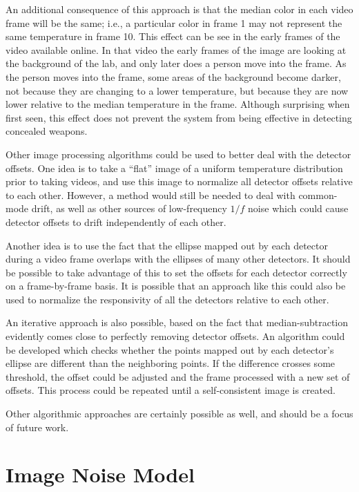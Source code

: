 An additional consequence of this approach is that the median color in each video frame will be the same; i.e., a particular color in frame 1 may not represent the same temperature in frame 10.
This effect can be see in the early frames of the video available online.
In that video the early frames of the image are looking at the background of the lab, and only later does a person move into the frame.
As the person moves into the frame, some areas of the background become darker, not because they are changing to a lower temperature, but because they are now lower relative to the median temperature in the frame.
Although surprising when first seen, this effect does not prevent the system from being effective in detecting concealed weapons.

Other image processing algorithms could be used to better deal with the detector offsets.
One idea is to take a ``flat'' image of a uniform temperature distribution prior to taking videos, and use this image to normalize all detector offsets relative to each other.
However, a method would still be needed to deal with common-mode drift, as well as other sources of low-frequency $1/f$ noise which could cause detector offsets to drift independently of each other.

Another idea is to use the fact that the ellipse mapped out by each detector during a video frame overlaps with the ellipses of many other detectors.
It should be possible to take advantage of this to set the offsets for each detector correctly on a frame-by-frame basis.
It is possible that an approach like this could also be used to normalize the responsivity of all the detectors relative to each other.

An iterative approach is also possible, based on the fact that median-subtraction evidently comes close to perfectly removing detector offsets.
An algorithm could be developed which checks whether the points mapped out by each detector's ellipse are different than the neighboring points.
If the difference crosses some threshold, the offset could be adjusted and the frame processed with a new set of offsets.
This process could be repeated until a self-consistent image is created.

Other algorithmic approaches are certainly possible as well, and should be a focus of future work.

\section{Image Noise Model}\label{sec:ch7-noise-model}


